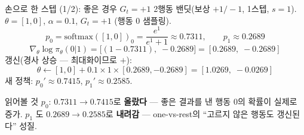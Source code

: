 \begin{frame}{손으로 한 스텝 (1/2): 좋은 경우 $G_t = +1$}
  2행동 밴딧(보상 $+1/-1$, 1스텝, $s=1$).
  $\theta=[1,0]$, $\alpha=0.1$, $G_t=+1$ (행동 0 샘플링).
  \[
  p_0 = \text{softmax}([1,0])_0 = \frac{e^1}{e^1+1} \approx 0.7311,
  \qquad p_1 \approx 0.2689
  \]
  \[
  \nabla_\theta \log\pi_\theta(0|1) = \big[(1-0.7311),\; -0.2689\big]
  = [0.2689,\; -0.2689]
  \]
  갱신(경사 상승 --- 최대화이므로 $+$):
  \[
  \theta \leftarrow [1,0] + 0.1 \times 1 \times [0.2689, -0.2689]
  = [1.0269,\; -0.0269]
  \]
  새 정책: $p_0' \approx \mathbf{0.7415}$, $p_1' \approx 0.2585$.
  \begin{block}{읽어볼 것}
    $p_0$: $0.7311 \to \mathbf{0.7415}$로 \textbf{올랐다} ---
    좋은 결과를 낸 행동 0의 확률이 실제로 증가.
    $p_1$ 도 $0.2689 \to 0.2585$로 \textbf{내려감} ---
    one-vs-rest의 ``고르지 않은 행동도 갱신된다'' 성질.
  \end{block}
\end{frame}

